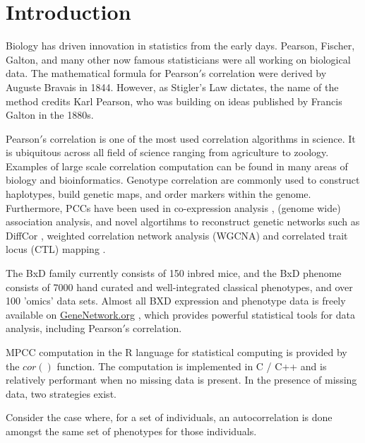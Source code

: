 \documentclass{bioinfo}
\begin{document}
\maketitle

\section{Introduction}
Biology has driven innovation in statistics from the early days. 
Pearson, Fischer, Galton, and many other now famous statisticians 
were all working on biological data. The mathematical formula 
for Pearson$'$s correlation were derived by Auguste Bravais in 1844. 
However, as Stigler's Law \citep{Stigler1980} dictates, the name 
of the method credits Karl Pearson, who was building on 
ideas published by Francis Galton in the 1880s. 


Pearson$'$s correlation is one of the most used correlation algorithms in science. 
It is ubiquitous across all field of science ranging from agriculture to 
zoology. Examples of large scale correlation computation can be found in many 
areas of biology and bioinformatics. Genotype correlation are commonly used to 
construct haplotypes, build genetic maps, and order markers within the genome. 
Furthermore, PCCs have been used in co-expression analysis \citep{Tesson:2010}, 
(genome wide) association analysis, and novel algortihms to reconstruct genetic 
networks such as DiffCor \citep{Fukushima:2013}, weighted correlation network 
analysis (WGCNA) \citep{Horvath:2008} and correlated trait locus (CTL) mapping 
\citep{Arends2016a}.

The BxD family currently consists of 150 inbred mice, and the BxD phenome consists 
of 7000 hand curated and well-integrated classical phenotypes, and over 100 'omics' 
data sets. Almost all BXD expression and phenotype data is freely available on 
\href{https://genenetwork.org/}{GeneNetwork.org} \citep{Sloan2016}, which provides 
powerful statistical tools for data analysis, including Pearson$'$s correlation.

MPCC computation in the R language for statistical computing \citep{R:2005} is 
provided by the $cor()$ function. The computation is implemented in C / C++ and 
is relatively performant when no missing data is present. In the 
presence of missing data, two strategies exist.

Consider the case where, for a set of individuals, an autocorrelation is done 
amongst the same set of phenotypes for those individuals.
\end{document}
